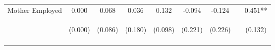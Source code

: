 \begin{tabular}{lcccccccc}
\noalign{\smallskip}Mother Employed & 0.000 & 0.068 & 0.036 & 0.132 & -0.094 & -0.124 &  & 0.451**\\
 & \begin{footnotesize}(0.000)\end{footnotesize} & \begin{footnotesize}(0.086)\end{footnotesize} & \begin{footnotesize}(0.180)\end{footnotesize} & \begin{footnotesize}(0.098)\end{footnotesize} & \begin{footnotesize}(0.221)\end{footnotesize} & \begin{footnotesize}(0.226)\end{footnotesize} & \begin{footnotesize}\end{footnotesize} & \begin{footnotesize}(0.132)\end{footnotesize}\\
\noalign{\smallskip}\hline\end{tabular}\\
